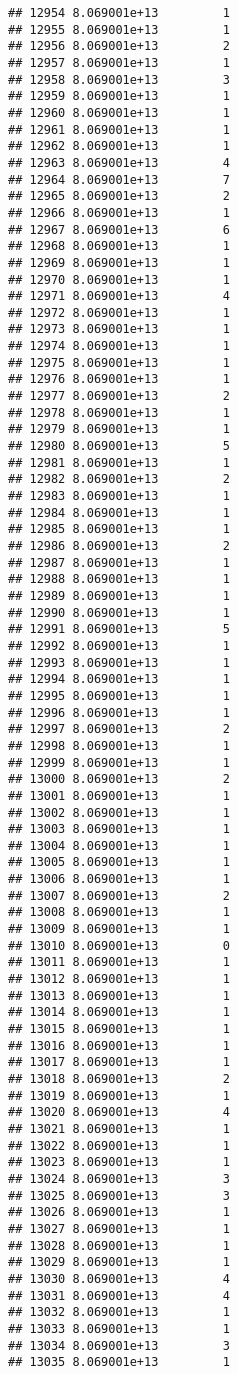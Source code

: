 \documentclass[
]{article}
\begin{document}
\begin{verbatim}
## 12954 8.069001e+13         1
## 12955 8.069001e+13         1
## 12956 8.069001e+13         2
## 12957 8.069001e+13         1
## 12958 8.069001e+13         3
## 12959 8.069001e+13         1
## 12960 8.069001e+13         1
## 12961 8.069001e+13         1
## 12962 8.069001e+13         1
## 12963 8.069001e+13         4
## 12964 8.069001e+13         7
## 12965 8.069001e+13         2
## 12966 8.069001e+13         1
## 12967 8.069001e+13         6
## 12968 8.069001e+13         1
## 12969 8.069001e+13         1
## 12970 8.069001e+13         1
## 12971 8.069001e+13         4
## 12972 8.069001e+13         1
## 12973 8.069001e+13         1
## 12974 8.069001e+13         1
## 12975 8.069001e+13         1
## 12976 8.069001e+13         1
## 12977 8.069001e+13         2
## 12978 8.069001e+13         1
## 12979 8.069001e+13         1
## 12980 8.069001e+13         5
## 12981 8.069001e+13         1
## 12982 8.069001e+13         2
## 12983 8.069001e+13         1
## 12984 8.069001e+13         1
## 12985 8.069001e+13         1
## 12986 8.069001e+13         2
## 12987 8.069001e+13         1
## 12988 8.069001e+13         1
## 12989 8.069001e+13         1
## 12990 8.069001e+13         1
## 12991 8.069001e+13         5
## 12992 8.069001e+13         1
## 12993 8.069001e+13         1
## 12994 8.069001e+13         1
## 12995 8.069001e+13         1
## 12996 8.069001e+13         1
## 12997 8.069001e+13         2
## 12998 8.069001e+13         1
## 12999 8.069001e+13         1
## 13000 8.069001e+13         2
## 13001 8.069001e+13         1
## 13002 8.069001e+13         1
## 13003 8.069001e+13         1
## 13004 8.069001e+13         1
## 13005 8.069001e+13         1
## 13006 8.069001e+13         1
## 13007 8.069001e+13         2
## 13008 8.069001e+13         1
## 13009 8.069001e+13         1
## 13010 8.069001e+13         0
## 13011 8.069001e+13         1
## 13012 8.069001e+13         1
## 13013 8.069001e+13         1
## 13014 8.069001e+13         1
## 13015 8.069001e+13         1
## 13016 8.069001e+13         1
## 13017 8.069001e+13         1
## 13018 8.069001e+13         2
## 13019 8.069001e+13         1
## 13020 8.069001e+13         4
## 13021 8.069001e+13         1
## 13022 8.069001e+13         1
## 13023 8.069001e+13         1
## 13024 8.069001e+13         3
## 13025 8.069001e+13         3
## 13026 8.069001e+13         1
## 13027 8.069001e+13         1
## 13028 8.069001e+13         1
## 13029 8.069001e+13         1
## 13030 8.069001e+13         4
## 13031 8.069001e+13         4
## 13032 8.069001e+13         1
## 13033 8.069001e+13         1
## 13034 8.069001e+13         3
## 13035 8.069001e+13         1

\end{verbatim}
\end{document}
